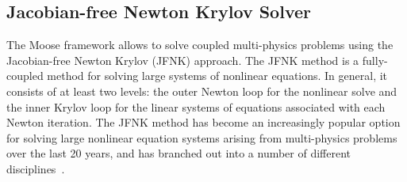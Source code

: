 \subsection{Jacobian-free Newton Krylov Solver\label{sec:jfnk}}
%
The Moose framework allows to solve coupled multi-physics problems using the
Jacobian-free Newton Krylov (JFNK) approach. 
The JFNK method is a fully-coupled method for solving large systems of
nonlinear equations. In general, it consists of at least two
levels: the outer Newton loop for the nonlinear solve and the inner
Krylov loop for the linear systems of equations associated with each Newton
iteration.  The JFNK method has become an increasingly popular option
for solving large nonlinear equation systems arising from
multi-physics problems over the last 20 years, and has branched out
into a number of different disciplines~\cite{Knoll_2004}.

